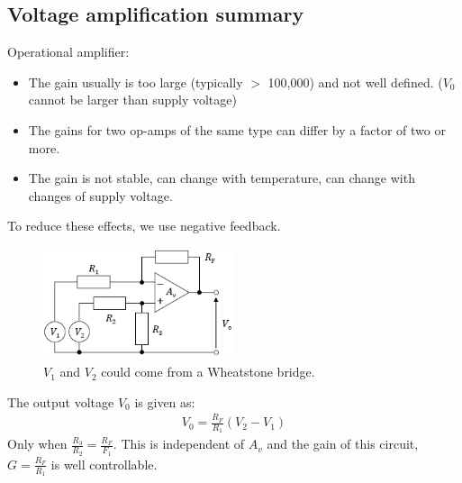 \documentclass[class=report, crop=false, 12pt,a4paper]{standalone}
\begin{document}
\subsection{Voltage amplification summary}
Operational amplifier:
\begin{itemize}
  \item The gain usually is too large (typically $>$ 100,000) and not well defined. ($V_0$ cannot be larger than supply voltage)
  \item The gains for two op-amps of the same type can differ by a factor of two or more.
  \item The gain is not stable, can change with temperature, can change with changes of supply voltage.
\end{itemize}
To reduce these effects, we use negative feedback.
\begin{figure}[H]
  \centering
  \includegraphics[width = 0.5\textwidth]{../img/diagram51.png}
  \caption{$V_1$ and $V_2$ could come from a Wheatstone bridge.}
\end{figure}
The output voltage $V_0$ is given as: 
\begin{gather}
  V_0 = \frac{R_F}{R_1}(V_2 - V_1)
\end{gather}
Only when $\frac{R_3}{R_2} = \frac{R_F}{F_1}$. This is independent of $A_v$ and the gain of this circuit, $G = \frac{R_F}{R_1}$ is well controllable.
\end{document}
